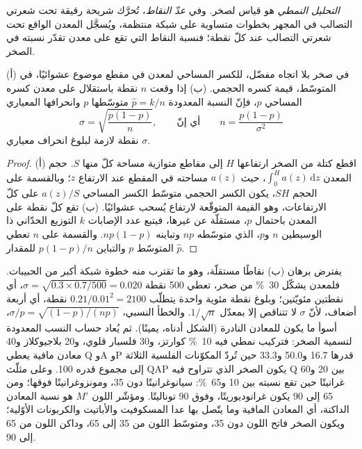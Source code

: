 \begin{definition}\label{def:b2:field-lab-methods-2:modal}
\emph{التحليل النمطي} هو قياس 
لصخر. وفي \emph{عدّ النقاط}، تُحرَّك شريحة
رقيقة تحت شعرتي التصالب في المجهر بخطوات متساوية على شبكة منتظمة، ويُسجَّل
المعدن الواقع تحت شعرتي التصالب عند كلّ نقطة؛ فنسبة النقاط التي
تقع على معدن تقدّر نسبته في الصخر.
\end{definition}

\begin{proposition}\label{prop:b2:field-lab-methods-2:counting}
(أ) في صخر بلا اتجاه مفضّل، للكسر المساحي لمعدن في مقطع موضوع
عشوائيًا، في المتوسّط، قيمة كسره الحجمي. (ب) إذا وقعت $n$ نقطة باستقلال
على معدن كسره المساحي $p$، فإنّ النسبة المعدودة $\hat p = k/n$ متوسّطها $p$ وانحرافها
المعياري
\begin{equation}
\sigma = \sqrt{\frac{p(1-p)}{n}} , \qquad\text{أي إنّ}\qquad n = \frac{p(1-p)}{\sigma^2}
\label{eq:b2:field-lab-methods-2:binomial}
\end{equation}
نقطة لازمة لبلوغ انحراف معياري $\sigma$.
\end{proposition}

\begin{proof}
(أ) اقطع كتلة من الصخر ارتفاعها $H$ إلى مقاطع متوازية مساحة كلّ منها $S$. حجم
المعدن $\int_0^H a(z)\,\mathrm{d}z$، حيث $a(z)$ مساحته في المقطع عند الارتفاع $z$؛
وبالقسمة على الحجم $SH$، يكون الكسر الحجمي متوسّط الكسر المساحي $a(z)/S$ على
كلّ الارتفاعات، وهو القيمة المتوقّعة لارتفاع يُسحب عشوائيًا. (ب) تقع كلّ نقطة على
المعدن باحتمال $p$، مستقلّة عن غيرها، فيتبع عدد الإصابات $k$
التوزيع الحدّاني ذا الوسيطين $n$ و$p$، الذي متوسّطه $np$ وتباينه $np(1-p)$. والقسمة على
$n$ تعطي المتوسّط $p$ والتباين $p(1-p)/n$ للمقدار $\hat p$.
\end{proof}

يفترض برهان (ب) نقاطًا مستقلّة، وهو ما تقترب منه خطوة شبكة أكبر من
الحبيبات. فلمعدن يشكّل \qty{30}{\percent} من صخر، تعطي 500 نقطة $\sigma =
\sqrt{0.3 \times 0.7/500} = 0.020$، أي نقطتين مئويّتين؛ وبلوغ نقطة مئوية واحدة يتطلّب
$0.21/0.01^2 = 2100$ نقطة، أي أربعة أضعاف، لأنّ $\sigma$ لا تتناقص إلا بمعدّل $1/\sqrt n$. والخطأ
النسبي، $\sigma/p = \sqrt{(1-p)/(np)}$، أسوأ ما يكون للمعادن النادرة (الشكل أدناه،
يمينًا). ثم يُعاد حساب النسب المعدودة لتسمية الصخر: فتركيب نمطي فيه
\qty{10}{\percent} كوارتز، و30 فلسبار قلوي، و20 بلاجيوكلاز و40 معادن مافية يعطي Q وA
وP قدرها 16.7 و50.0 و33.3 حين تُردّ المكوّنات الفلسية الثلاثة إلى مجموع قدره 100. وعلى مثلّث
QAP يكون الصخر الذي تتراوح فيه Q بين 20 و60 غرانيتًا حين تقع نسبته  بين 10
و\qty{65}{\percent}: سيانوغرانيتًا دون 35، ومونزوغرانيتًا فوقها؛ ومن 65 إلى 90 يكون
غرانوديوريتًا، وفوق 90 توناليتًا. ومؤشّر اللون $M'$ هو نسبة المعادن الداكنة، أي
المعادن المافية وما يتّصل بها عدا المسكوفيت والأباتيت والكربونات الأوّلية؛ ويكون الصخر
فاتح اللون دون 35، ومتوسّط اللون من 35 إلى 65، وداكن اللون من 65 إلى 90.

